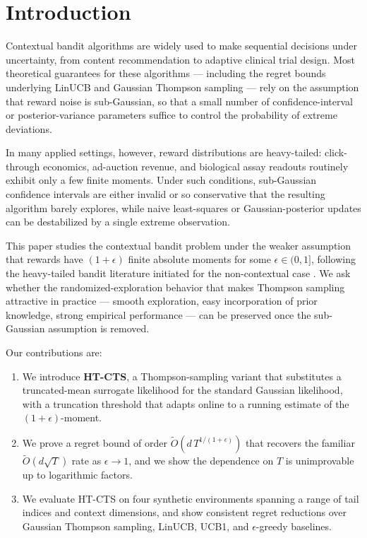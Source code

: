 \section{Introduction}
Contextual bandit algorithms are widely used to make sequential decisions under uncertainty, from content recommendation to adaptive clinical trial design. Most theoretical guarantees for these algorithms --- including the regret bounds underlying LinUCB and Gaussian Thompson sampling --- rely on the assumption that reward noise is sub-Gaussian, so that a small number of confidence-interval or posterior-variance parameters suffice to control the probability of extreme deviations.

In many applied settings, however, reward distributions are heavy-tailed: click-through economics, ad-auction revenue, and biological assay readouts routinely exhibit only a few finite moments. Under such conditions, sub-Gaussian confidence intervals are either invalid or so conservative that the resulting algorithm barely explores, while naive least-squares or Gaussian-posterior updates can be destabilized by a single extreme observation.

This paper studies the contextual bandit problem under the weaker assumption that rewards have $(1+\epsilon)$ finite absolute moments for some $\epsilon \in (0, 1]$, following the heavy-tailed bandit literature initiated for the non-contextual case \citep{holt2021heavytail, rostova2021ucb}. We ask whether the randomized-exploration behavior that makes Thompson sampling attractive in practice --- smooth exploration, easy incorporation of prior knowledge, strong empirical performance --- can be preserved once the sub-Gaussian assumption is removed.

Our contributions are:
\begin{enumerate}[leftmargin=*]
    \item We introduce \textbf{HT-CTS}, a Thompson-sampling variant that substitutes a truncated-mean surrogate likelihood for the standard Gaussian likelihood, with a truncation threshold that adapts online to a running estimate of the $(1+\epsilon)$-moment.
    \item We prove a regret bound of order $\widetilde{O}(d\,T^{1/(1+\epsilon)})$ that recovers the familiar $\widetilde{O}(d\sqrt{T})$ rate as $\epsilon \to 1$, and we show the dependence on $T$ is unimprovable up to logarithmic factors.
    \item We evaluate HT-CTS on four synthetic environments spanning a range of tail indices and context dimensions, and show consistent regret reductions over Gaussian Thompson sampling, LinUCB, UCB1, and $\epsilon$-greedy baselines.
\end{enumerate}
